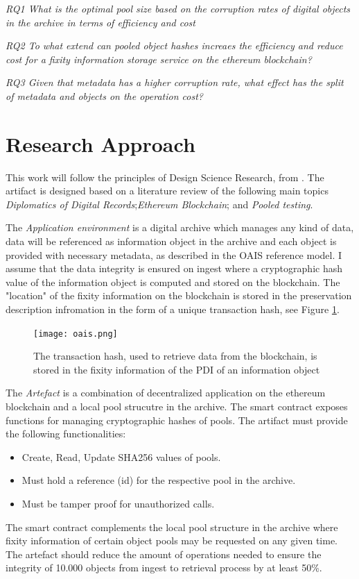 \textit{RQ1 What is the optimal pool size based on the corruption rates of digital objects in the archive in terms of efficiency and cost}

\textit{RQ2 To what extend can pooled object hashes increaes the efficiency and reduce cost for a fixity information storage service on the ethereum blockchain?}

\textit{RQ3 Given that metadata has a higher corruption rate, what effect has the split of metadata and objects on the operation cost?}

\section{Research Approach}
\label{sec:approach}
This work will follow the principles of Design Science Research, from \cite{hevner2007three}. The artifact is designed based on a literature review of the following main topics \textit{Diplomatics of Digital Records};\textit{Ethereum Blockchain}; and \textit{Pooled testing}.

The \textit{Application environment} is a digital archive which manages any kind of data, data will be referenced as information object in the archive and each object is provided with necessary metadata, as described in the OAIS reference model. I assume that the data integrity is ensured on ingest where a cryptographic hash value of the information object is computed and stored on the blockchain. The "location" of the fixity information on the blockchain is stored in the preservation description infromation in the form of a unique transaction hash, see Figure \ref{fig:oais-fixity}. 

\begin{figure}[h]
  \caption{The transaction hash, used to retrieve data from the blockchain, is stored in the fixity information of the PDI of an information object \cite[7]{lee2010open}}
  \label{fig:oais-fixity}
  \centering
    \texttt{[image: oais.png]}
\end{figure}

The \textit{Artefact} is a combination of decentralized application on the ethereum blockchain and a local pool strucutre in the archive. The smart contract exposes functions for managing cryptographic hashes of pools.
The artifact must provide the following functionalities:
\begin{itemize}
  \item Create, Read, Update SHA256 values of pools.
  \item Must hold a reference (id) for the respective pool in the archive.
  \item Must be tamper proof for unauthorized calls.
\end{itemize}
The smart contract complements the local pool structure in the archive where fixity information of certain object pools may be requested on any given time. The artefact should reduce the amount of operations needed to ensure the integrity of 10.000 objects from ingest to retrieval process by at least 50\%.